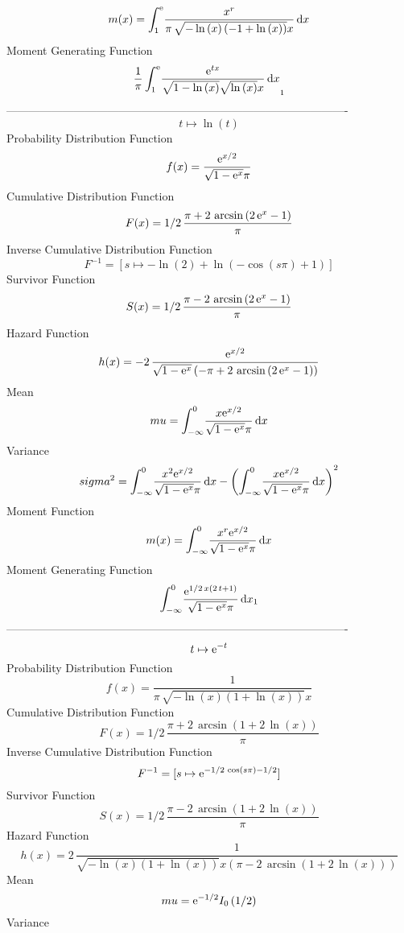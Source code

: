 \documentclass[12pt]{article}
\begin{document}
 $$ m(x) = \int_{1}^{{\rm e}}\!{\frac {{x}^{r}}{\pi\,\sqrt {-\ln  \left( x
 \right)  \left( -1+\ln  \left( x \right)  \right) }x}}\,{\rm d}x
$$ Moment Generating Function 
 $${\frac {1}{\pi}\int_{1}^{{\rm e}}\!{\frac {{{\rm e}^{tx}}}{\sqrt {1-
\ln  \left( x \right) }\sqrt {\ln  \left( x \right) }x}}\,{\rm d}x}_{{
1}}
$$-------------------------------------------------------------------------------------------  \\$$t\mapsto \ln  \left( t \right) 
$$Probability Distribution Function 
$$  f(x)={\frac {{{\rm e}^{x/2}}}{\sqrt {1-{{\rm e}^{x}}}\pi}}
$$Cumulative Distribution Function  
 $$F(x)=1/2\,{\frac {\pi+2\,\arcsin \left( 2\,{{\rm e}^{x}}-1 \right) }{\pi}}
$$ Inverse Cumulative Distribution Function 
  $$F^{-1} = [s\mapsto -\ln  \left( 2 \right) +\ln  \left( -\cos \left( s\pi
 \right) +1 \right) ]
$$Survivor Function 
 $$ S(x)=1/2\,{\frac {\pi-2\,\arcsin \left( 2\,{{\rm e}^{x}}-1 \right) }{\pi}}
$$ Hazard Function 
 $$ h(x)=-2\,{\frac {{{\rm e}^{x/2}}}{\sqrt {1-{{\rm e}^{x}}} \left( -\pi+2\,
\arcsin \left( 2\,{{\rm e}^{x}}-1 \right)  \right) }}
$$ Mean 
 $$ mu=\int_{-\infty }^{0}\!{\frac {x{{\rm e}^{x/2}}}{\sqrt {1-{{\rm e}^{x}}}
\pi}}\,{\rm d}x
$$ Variance 
 $$ sigma^2 = \int_{-\infty }^{0}\!{\frac {{x}^{2}{{\rm e}^{x/2}}}{\sqrt {1-{{\rm e}
^{x}}}\pi}}\,{\rm d}x- \left( \int_{-\infty }^{0}\!{\frac {x{{\rm e}^{
x/2}}}{\sqrt {1-{{\rm e}^{x}}}\pi}}\,{\rm d}x \right) ^{2}
$$ Moment Function 
 $$ m(x) = \int_{-\infty }^{0}\!{\frac {{x}^{r}{{\rm e}^{x/2}}}{\sqrt {1-{{\rm e}
^{x}}}\pi}}\,{\rm d}x
$$ Moment Generating Function 
 $$\int_{-\infty }^{0}\!{\frac {{{\rm e}^{1/2\,x \left( 2\,t+1 \right) }}
}{\sqrt {1-{{\rm e}^{x}}}\pi}}\,{\rm d}x_{{1}}
$$-------------------------------------------------------------------------------------------  \\$$t\mapsto {{\rm e}^{-t}}
$$Probability Distribution Function 
$$  f(x)={\frac {1}{\pi\,\sqrt {-\ln  \left( x \right)  \left( 1+\ln  \left( x
 \right)  \right) }x}}
$$Cumulative Distribution Function  
 $$F(x)=1/2\,{\frac {\pi+2\,\arcsin \left( 1+2\,\ln  \left( x \right) 
 \right) }{\pi}}
$$ Inverse Cumulative Distribution Function 
  $$F^{-1} = [s\mapsto {{\rm e}^{-1/2\,\cos \left( s\pi \right) -1/2}}]
$$Survivor Function 
 $$ S(x)=1/2\,{\frac {\pi-2\,\arcsin \left( 1+2\,\ln  \left( x \right) 
 \right) }{\pi}}
$$ Hazard Function 
 $$ h(x)=2\,{\frac {1}{\sqrt {-\ln  \left( x \right)  \left( 1+\ln  \left( x
 \right)  \right) }x \left( \pi-2\,\arcsin \left( 1+2\,\ln  \left( x
 \right)  \right)  \right) }}
$$ Mean 
 $$ mu={{\rm e}^{-1/2}}{{\sl I}_{0}\left(1/2\right)}
$$ Variance 
\end{document}
